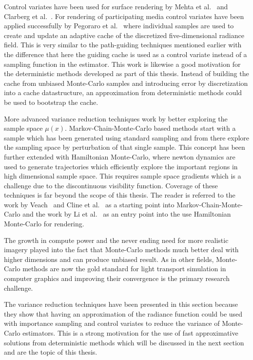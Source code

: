 Control variates have been used for surface rendering by Mehta et al.~\cite{Mehta12} and Clarberg et al.~\cite{Clarberg08}. For rendering of participating media control variates have been applied successfully by Pegoraro et al.~\cite{Pegoraro08} where individual samples are used to create and update an adaptive cache of the discretized five-dimensional radiance field. This is very similar to the path-guiding techniques mentioned earlier with the difference that here the guiding cache is used as a control variate instead of a sampling function in the estimator. This work is likewise a good motivation for the deterministic methods developed as part of this thesis. Instead of building the cache from unbiased Monte-Carlo samples and introducing error by discretization into a cache datastructure, an approximation from deterministic methods could be used to bootstrap the cache.

More advanced variance reduction techniques work by better exploring the sample space $\mu\left(x\right)$. Markov-Chain-Monte-Carlo based methods start with a sample which has been generated using standard sampling and from there explore the sampling space by perturbation of that single sample. This concept has been further extended with Hamiltonian Monte-Carlo, where newton dynamics are used to generate trajectories which efficiently explore the important regions in high dimensional sample space. This requires sample space gradients which is a challenge due to the discontinuous visibility function. Coverage of these techniques is far beyond the scope of this thesis. The reader is referred to the work by Veach~\cite{VeachThesis97} and Cline et al.~\cite{Cline05, Cline05apractical} as a starting point into Markov-Chain-Monte-Carlo and the work by Li et al.~\cite{Li15} as an entry point into the use Hamiltonian Monte-Carlo for rendering.

The growth in compute power and the never ending need for more realistic imagery played into the fact that Monte-Carlo methods much better deal with higher dimensions and can produce unbiased result. As in other fields, Monte-Carlo methods are now the gold standard for light transport simulation in computer graphics and improving their convergence is the primary research challenge.

The variance reduction techniques have been presented in this section because they show that having an approximation of the radiance function could be used with importance sampling and control variates to reduce the variance of Monte-Carlo estimators. This is a strong motivation for the use of fast approximative solutions from deterministic methods which will be discussed in the next section and are the topic of this thesis.


